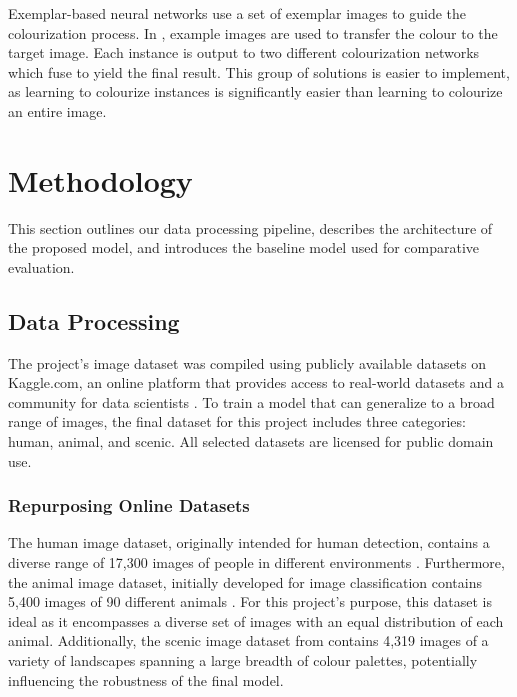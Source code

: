 \documentclass{article} %
\begin{document}
Exemplar-based neural networks use a set of exemplar images to guide the colourization process. In \cite{su2020instanceawareimagecolorization}, example images are
used to transfer the colour to the target image. Each instance is output to two different colourization networks which fuse to yield the final result. This group of 
solutions is easier to implement, as learning to colourize instances is significantly easier than learning to colourize an entire image. 

\section{Methodology}
\label{methodology}

This section outlines our data processing pipeline, describes the architecture of the proposed model, and introduces the baseline model used for comparative evaluation.

\subsection{Data Processing}

 The project's image dataset was compiled using publicly available datasets on Kaggle.com, an online platform that provides access to real-world datasets and a community for data scientists \cite[]{kaggle}. To train a model that can generalize to a broad range of images, the final dataset for this project includes three categories: human, animal, and scenic. All selected datasets are licensed for public domain use. 

 \subsubsection{Repurposing Online Datasets}

The human image dataset, originally intended for human detection, contains a diverse range of 17,300 images of people in different environments \cite[]{kaggle_human}. Furthermore, the animal image dataset, initially developed for image classification contains 5,400 images of 90 different animals \cite[]{kaggle_animal}. For this project’s purpose, this dataset is ideal as it encompasses a diverse set of images with an equal distribution of each animal. Additionally, the scenic image dataset from \cite{kaggle_scene} contains 4,319 images of a variety of landscapes spanning a large breadth of colour palettes, potentially influencing the robustness of the final model.
\end{document}

